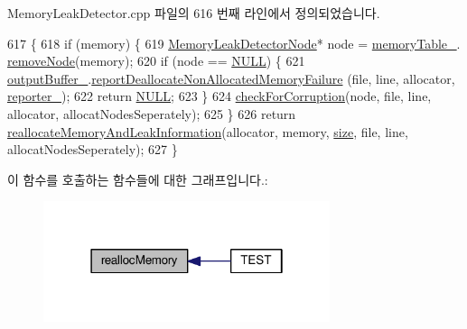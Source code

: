 Memory\+Leak\+Detector.\+cpp 파일의 616 번째 라인에서 정의되었습니다.


\begin{DoxyCode}
617 \{
618     \textcolor{keywordflow}{if} (memory) \{
619         \hyperlink{struct_memory_leak_detector_node}{MemoryLeakDetectorNode}* node = \hyperlink{class_memory_leak_detector_abee17cabbc59ef23d6f51027208a100c}{memoryTable\_}.
      \hyperlink{struct_memory_leak_detector_table_aaa0452383ce806d8a7248cb567813f84}{removeNode}(memory);
620         \textcolor{keywordflow}{if} (node == \hyperlink{openavb__types__base__pub_8h_a070d2ce7b6bb7e5c05602aa8c308d0c4}{NULL}) \{
621             \hyperlink{class_memory_leak_detector_a7d0b175420d83f9ee397b398ae14ac75}{outputBuffer\_}.\hyperlink{class_memory_leak_output_string_buffer_a0061b779a33beb2d8c87eb915b20309a}{reportDeallocateNonAllocatedMemoryFailure}
      (file, line, allocator, \hyperlink{class_memory_leak_detector_a632df6e6476c93d9c58a104a17e155d9}{reporter\_});
622             \textcolor{keywordflow}{return} \hyperlink{openavb__types__base__pub_8h_a070d2ce7b6bb7e5c05602aa8c308d0c4}{NULL};
623         \}
624         \hyperlink{class_memory_leak_detector_ae260d75b307f341763273c1e99a11c1d}{checkForCorruption}(node, file, line, allocator, allocatNodesSeperately);
625     \}
626     \textcolor{keywordflow}{return} \hyperlink{class_memory_leak_detector_aa670d663e64a85135a23f26c124e5bd7}{reallocateMemoryAndLeakInformation}(allocator, memory, 
      \hyperlink{gst__avb__playbin_8c_a439227feff9d7f55384e8780cfc2eb82}{size}, file, line, allocatNodesSeperately);
627 \}
\end{DoxyCode}


이 함수를 호출하는 함수들에 대한 그래프입니다.\+:
\nopagebreak
\begin{figure}[H]
\begin{center}
\leavevmode
\includegraphics[width=238pt]{class_memory_leak_detector_a6aded764a2297f52a104b75eae2d4b5c_icgraph}
\end{center}
\end{figure}


